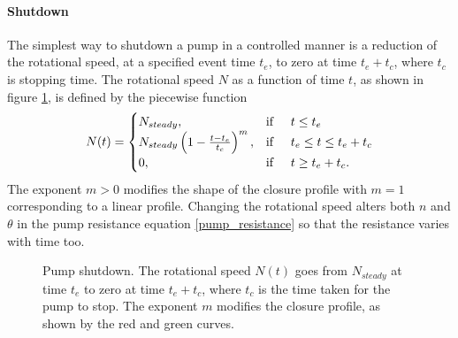 \documentclass[12pt]{article}
\begin{document}
\paragraph{Shutdown}

The simplest way to shutdown a pump in a controlled manner is a reduction of the rotational speed, at a specified event time $t_e$, to zero at time $t_e + t_c$, where $t_c$ is stopping time. The rotational speed $N$ as a function of time $t$, as shown in figure \ref{fig:pump_shutdown}, is defined by the piecewise function
\begin{align}\label{pump_shutdown_function}
N(t) = 
\begin{cases} 
N_{steady}, &\text{if} \hspace{0.5cm} t \leq t_e \\
N_{steady} \left( 1 - \frac{t-t_e}{t_c} \right)^m, &\text{if} \hspace{0.5cm} t_e \leq t \leq t_e + t_c \\
0, &\text{if} \hspace{0.5cm} t \geq t_e + t_c. 
\end{cases}
\end{align}
The exponent $m > 0$ modifies the shape of the closure profile with $m=1$ corresponding to a linear profile. Changing the rotational speed alters both $n$ and $\theta$ in the pump resistance equation \eqref{pump_resistance} so that the resistance varies with time too. 

\begin{figure}
\centering
{} 
\caption{Pump shutdown. The rotational speed $N(t)$ goes from $N_{steady}$ at time $t_e$ to zero at time $t_e + t_c$, where $t_c$ is the time taken for the pump to stop. The exponent $m$ modifies the closure profile, as shown by the red and green curves.}
\label{fig:pump_shutdown}
\end{figure}
\end{document}
